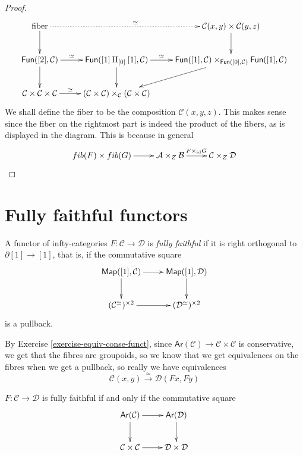 \begin{proof}
$$
\xymatrix{
\text{fiber}\ar[d]\ar@{.>}[rr]^{\simeq}&&
\mathcal{C}(x,y)\times
\mathcal{C}(y,z)\ar[d]\\
\mathsf{Fun}([2],\mathcal{C})\ar[r]^-{\simeq}
\ar[d]&
\mathsf{Fun}([1]\amalg_{[0]}[1],\mathcal{C})
\ar[r]^-{\simeq}\ar[d]
&\mathsf{Fun}([1],\mathcal{C})
\times_{\mathsf{Fun}([0],\mathcal{C})}
\mathsf{Fun}([1],\mathcal{C})\ar[ld]\\
\mathcal{C}\times\mathcal{C}\times\mathcal{C}
\ar[r]^-{\simeq}&
(\mathcal{C} \times \mathcal{C})
\times_{\mathcal{C}}(\mathcal{C}
\times\mathcal{C})
}
$$
We shall define the fiber to be the
composition $\mathcal{C}(x,y,z)$.
This makes sense since
the fiber on the rightmost part
is indeed the product of the fibers,
as is displayed in the diagram.
This is because in general
$$
\xymatrix{
fib(F)\times fib(G)\ar[r]&
\mathcal{A}\times_Z \mathcal{B}
\ar[r]^{F\times_{\text{id}}G}&
\mathcal{C}\times_Z \mathcal{D}
}
$$
\end{proof}


\section{Fully faithful functors}
\label{section-fully-faithful-functors}

\begin{definition}
\label{definition-fully-faithful}
A functor of infty-categories
$F:\mathcal{C} \to \mathcal{D}$
is {\it fully faithful} if it is
right orthogonal to $\partial[1] \to [1]$,
that is, if the commutative square
$$
\xymatrix{
\mathsf{Map}([1],\mathcal{C})\ar[r]\ar[d]&
\mathsf{Map}([1],\mathcal{D})\ar[d]\\
(\mathcal{C}^\simeq)^{\times 2}\ar[r]&
(\mathcal{D}^\simeq)^{\times 2}
}
$$
is a pullback.
\end{definition}

By Exercise \ref{exercise-equiv-conse-funct},
since
$\mathsf{Ar}(\mathcal{C})\to
\mathcal{C}\times\mathcal{C}$
is conservative, we get that the fibres
are groupoids, so we know that we get
equivalences
on the fibres when we get a pullback, so
really we have
equivalences
$$
\mathcal{C}(x,y)\xrightarrow{\simeq}
\mathcal{D}(Fx,Fy)
$$
\begin{proposition}
\label{proposition-fully-faith-iff-pullb}
$F:\mathcal{C} \to \mathcal{D}$ is fully
faithful
if and only if the commutative square
$$
\xymatrix{
\mathsf{Ar}(\mathcal{C})\ar[r]\ar[d]&
\mathsf{Ar}(\mathcal{D})\ar[d]\\
\mathcal{C}\times\mathcal{C}\ar[r]&
\mathcal{D}\times\mathcal{D}
}
$$
\end{proposition}

